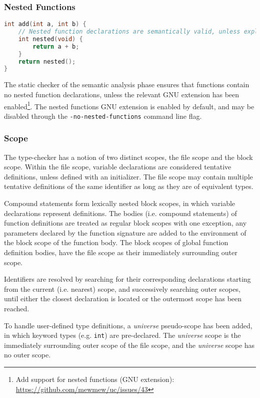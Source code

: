 \subsubsection{Nested Functions}

\begin{lstlisting}[language=C,style=c,caption={\label{fig:nested_func_decl}Nested function declarations.}]
int add(int a, int b) {
	// Nested function declarations are semantically valid, unless explicitly disabled.
	int nested(void) {
		return a + b;
	}
	return nested();
}
\end{lstlisting}

The static checker of the semantic analysis phase ensures that functions contain no nested function declarations, unless the relevant GNU extension has been enabled\footnote{Add support for nested functions (GNU extension): \url{https://github.com/mewmew/uc/issues/43}}. The nested functions GNU extension is enabled by default, and may be disabled through the \texttt{-no-nested-functions} command line flag.

\subsubsection{Scope}
\label{sec:scope}

The type-checker has a notion of two distinct scopes, the file scope and the block scope. Within the file scope, variable declarations are considered tentative definitions, unless defined with an initializer. The file scope may contain multiple tentative definitions of the same identifier as long as they are of equivalent types.

Compound statements form lexically nested block scopes, in which variable declarations represent definitions. The bodies (i.e. compound statements) of function definitions are treated as regular block scopes with one exception, any parameters declared by the function signature are added to the environment of the block scope of the function body. The block scopes of global function definition bodies, have the file scope as their immediately surrounding outer scope.

Identifiers are resolved by searching for their corresponding declarations starting from the current (i.e. nearest) scope, and successively searching outer scopes, until either the closest declaration is located or the outermost scope has been reached.

To handle user-defined type definitions, a \textit{universe} pseudo-scope has been added, in which keyword types (e.g. \texttt{int}) are pre-declared. The \textit{universe} scope is the immediately surrounding outer scope of the file scope, and the \textit{universe} scope has no outer scope.

